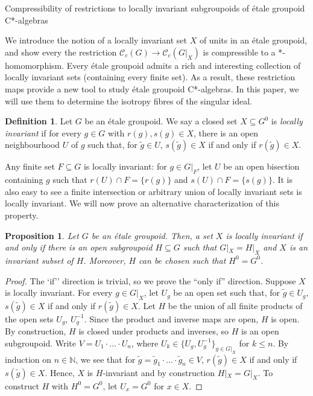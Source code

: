 \documentclass[a4paper, 12pt]{amsart}
\newtheorem{prp}[thm]{Proposition}
\theoremstyle{definition}
\newtheorem{dfn}[thm]{Definition}
\theoremstyle{remark}
\numberwithin{equation}{section}
\begin{document}
\begin{section}{Compressibility of restrictions to locally invariant subgroupoids of \'etale groupoid C*-algebras}

We introduce the notion of a locally invariant set $X$ of units in an \'etale groupoid, and show every the restriction $\mathscr{C}_{c}(G)\to \mathscr{C}_{c}(G|_{X})$ is compressible to a *-homomorphism. Every \'etale groupoid admits a rich and interesting collection of locally invariant sets (containing every finite set). As a result, these restriction maps provide a new tool to study \'etale groupoid C*-algebras. In this paper, we will use them to determine the isotropy fibres of the singular ideal.

\begin{dfn}
\label{dfn:locinvar}
    Let $G$ be an \'etale groupoid. We say a closed set $X\subseteq G^{0}$ is \emph{locally invariant} if for every $g\in G$ with $r(g),s(g)\in X$, there is an open neighbourhood $U$ of $g$ such that, for $\tilde{g}\in U$, $s(\tilde{g})\in X$ if and only if $r(\tilde{g})\in X$.
\end{dfn}

Any finite set $F\subseteq G$ is locally invariant: for $g\in G|_{F}$, let $U$ be an open bisection containing $g$ such that $r(U)\cap F = \{r(g)\}$ and $s(U)\cap F = \{s(g)\}$. It is also easy to see a finite intersection or arbitrary union of locally invariant sets is locally invariant. We will now prove an alternative characterization of this property.

\begin{prp}
\label{prp:germexists}
    Let $G$ be an \'etale groupoid. Then, a set $X$ is locally invariant if and only if there is an open subgroupoid $H\subseteq G$ such that $G|_{X} = H|_{X}$ and $X$ is an invariant subset of $H$. Moreover, $H$ can be chosen such that $H^{0} = G^{0}$.
\end{prp}

\begin{proof}
    The `if'' direction is trivial, so we prove the ``only if'' direction. Suppose $X$ is locally invariant. For every $g\in G|_{X}$, let $U_{g}$ be an open set such that, for $\tilde{g}\in U_{g}$, $s(\tilde{g})\in X$ if and only if $r(\tilde{g})\in X$. Let $H$ be the union of all finite products of the open sets $U_{g}$, $U_{g}^{-1}$. Since the product and inverse maps are open, $H$ is open. By construction, $H$ is closed under products and inverses, so $H$ is an open subgroupoid. Write $V = U_{1}\cdot...\cdot U_{n}$, where $U_{k}\in \{U_{g},U^{-1}_{g}\}_{g\in G|_{X}}$ for $k\leq n$. By induction on $n\in\mathbb{N}$, we see that for $\tilde{g} = \tilde{g}_{1}\cdot...\cdot\tilde{g}_{n}\in V$, $r(\tilde{g})\in X$ if and only if $s(\tilde{g})\in X$. Hence, $X$ is $H$-invariant and by construction $H|_{X} = G|_{X}$. To construct $H$ with $H^{0} = G^{0}$, let $U_{x} = G^{0}$ for $x\in X$.
\end{proof}


\end{section}
\end{document}
